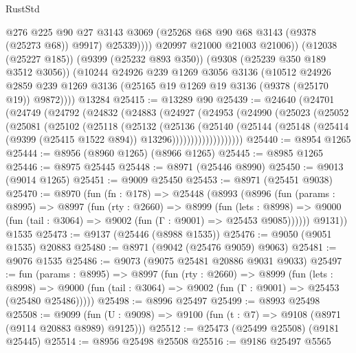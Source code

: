 \begin{lexlean}{RustStd}
\begin{coremodule}
                  @276
                  @225
                  @90
                  @27
                  @3143
                  @3069
                  (@25268 @68 @90 @68 @3143 (@9378 (@25273 @68)) @9917)
                  @25339))))
          @20997
          @21000
          @21003
          @21006))
      (@12038 (@25227 @185))
      (@9399 (@25232 @893 @350))
      (@9308 (@25239 @350 @189 @3512 @3056))
      (@10244
        @24926
        @239
        @1269
        @3056
        @3136
        (@10512
          @24926
          @2859
          @239
          @1269
          @3136
          (@25165 @19 @1269 @19 @3136 (@9378 (@25170 @19)) @9872))))
    @13284
@25415 := @13289 @90
@25439 := @24640
    (@24701
      (@24749
        (@24792
          (@24832
            (@24883
              (@24927
                (@24953
                  (@24990
                    (@25023
                      (@25052
                        (@25081
                          (@25102
                            (@25118
                              (@25132
                                (@25136
                                  (@25140
                                    (@25144
                                      (@25148
                                        (@25414
                                          (@9399 (@25415 @1522 @894))
                                          @13296)))))))))))))))))))
@25440 := @8954 @1265
@25444 := @8956 (@8960 @1265) (@8966 @1265)
@25445 := @8985 @1265
@25446 := @8975 @25445
@25448 := @8971 (@25446 @8990)
@25450 := @9013 (@9014 @1265)
@25451 := @9009 @25450
@25453 := @8971 (@25451 @9038)
@25470 := @8970
    (fun (fn : @178) =>
    @25448
      (@8993
        (@8996
          (fun (params : @8995) =>
          @8997
            (fun (rty : @2660) =>
            @8999
              (fun (lets : @8998) =>
              @9000 (fun (tail : @3064) => @9002 (fun (Γ : @9001) => @25453 @9085))))))
        @9131))
    @1535
@25473 := @9137 (@25446 (@8988 @1535))
@25476 := @9050 (@9051 @1535) @20883
@25480 := @8971 (@9042 (@25476 @9059) @9063)
@25481 := @9076 @1535
@25486 := @9073 (@9075 @25481 @20886 @9031 @9033)
@25497 := fun (params : @8995) =>
  @8997
    (fun (rty : @2660) =>
    @8999
      (fun (lets : @8998) =>
      @9000 (fun (tail : @3064) => @9002 (fun (Γ : @9001) => @25453 (@25480 @25486)))))
@25498 := @8996 @25497
@25499 := @8993 @25498
@25508 := @9099
    (fun (U : @9098) => @9100 (fun (t : @7) => @9108 (@8971 (@9114 @20883 @8989) @9125)))
@25512 := @25473 (@25499 @25508) (@9181 @25445)
@25514 := @8956 @25498 @25508
@25516 := @9186 @25497 @5565

\end{coremodule}
\end{lexlean}
